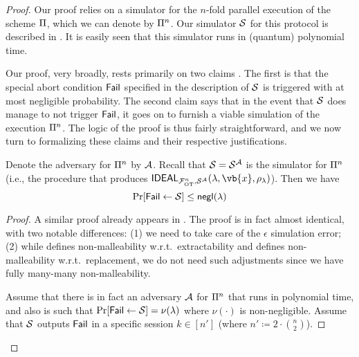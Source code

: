 \begin{proof}
    Our proof relies on a simulator for the $n$-fold parallel execution of the scheme $\mathrm{\Pi}$, which we can denote by $\mathrm{\Pi}^n$. Our simulator $\mathcal{S}$ for this protocol is described in . It is easily seen that this simulator runs in (quantum) polynomial time. 

    Our proof, very broadly, rests primarily on two claims . The first is that the special abort condition $\mathsf{Fail}$ specified in the description of $\mathcal{S}$ is triggered with at most negligible probability. The second claim says that in the event that $\mathcal{S}$ does manage to not trigger $\mathsf{Fail}$, it goes on to furnish a viable simulation of the execution $\mathrm{\Pi}^n$. The logic of the proof is thus fairly straightforward, and we now turn to formalizing these claims and their respective justifications. 

    \begin{lemma}\label{malOT:lem:fail}
        Denote the adversary for $\mathrm{\Pi}^n$ by $\mathcal{A}$. Recall that $\mathcal{S} = \mathcal{S}^\mathcal{A}$ is the simulator for $\mathrm{\Pi}^n$ (i.e., the procedure that produces $\IDEAL_{\mathcal{F}^n_{\text{OT}}, \Sim^\Adv}(\secpar, \vb{x}, \rho_\secpar)$). Then we have $$\Pr[\mathsf{Fail} \gets \mathcal{S}] \leq \mathsf{negl}(\lambda)$$
    \end{lemma}

    \begin{proof}
        A similar proof already appears in \cite{FOCS:Wee10,STOC:Goyal11}. The proof is in fact almost identical, with two notable differences: (1) we need to take care of the $\epsilon$ simulation error; (2) while \cite{FOCS:Wee10} defines non-malleability w.r.t.\ extractability and \cite{STOC:Goyal11} defines non-malleability w.r.t.\ replacement, we do not need such adjustments since we have fully many-many non-malleability.

        Assume that there is in fact an adversary $\mathcal{A}$ for $\mathrm{\Pi}^n$ that runs in polynomial time, and also is such that $\Pr[\mathsf{Fail} \gets \mathcal{S}] = \nu(\lambda)$ where $\nu(\cdot)$ is non-negligible. Assume that $\mathcal{S}$ outputs $\mathsf{Fail}$ in a specific session $k \in [n']$ (where $n'\coloneqq 2 \cdot\binom{n}{2}$). 
        

\end{proof}
\end{proof}
